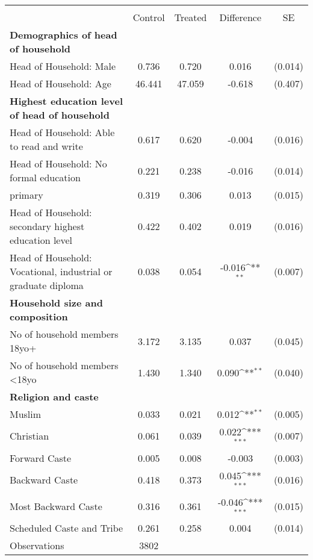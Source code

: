 {
\def\sym#1{\ifmmode^{#1}\else\(^{#1}\)\fi}
\begin{tabular}{l*{1}{cccc}}
\hline\hline
                    &\multicolumn{4}{c}{}                                        \\
                    &     Control&     Treated&  Difference         &          SE\\
\hline
\textbf{Demographics of head of household}&            &            &                     &            \\
Head of Household: Male&       0.736&       0.720&       0.016         &     (0.014)\\
Head of Household: Age&      46.441&      47.059&      -0.618         &     (0.407)\\
\textbf{Highest education level of head of household}&            &            &                     &            \\
Head of Household: Able to read and write&       0.617&       0.620&      -0.004         &     (0.016)\\
Head of Household: No formal education&       0.221&       0.238&      -0.016         &     (0.014)\\
primary             &       0.319&       0.306&       0.013         &     (0.015)\\
Head of Household: secondary highest education level&       0.422&       0.402&       0.019         &     (0.016)\\
Head of Household: Vocational, industrial or graduate diploma&       0.038&       0.054&      -0.016\sym{**} &     (0.007)\\
\textbf{Household size and composition}&            &            &                     &            \\
No of household members 18yo+&       3.172&       3.135&       0.037         &     (0.045)\\
No of household members <18yo&       1.430&       1.340&       0.090\sym{**} &     (0.040)\\
\textbf{Religion and caste}&            &            &                     &            \\
Muslim              &       0.033&       0.021&       0.012\sym{**} &     (0.005)\\
Christian           &       0.061&       0.039&       0.022\sym{***}&     (0.007)\\
Forward Caste       &       0.005&       0.008&      -0.003         &     (0.003)\\
Backward Caste      &       0.418&       0.373&       0.045\sym{***}&     (0.016)\\
Most Backward Caste &       0.316&       0.361&      -0.046\sym{***}&     (0.015)\\
Scheduled Caste and Tribe&       0.261&       0.258&       0.004         &     (0.014)\\
\hline
Observations        &        3802&            &                     &            \\
\hline\hline
\end{tabular}
}

